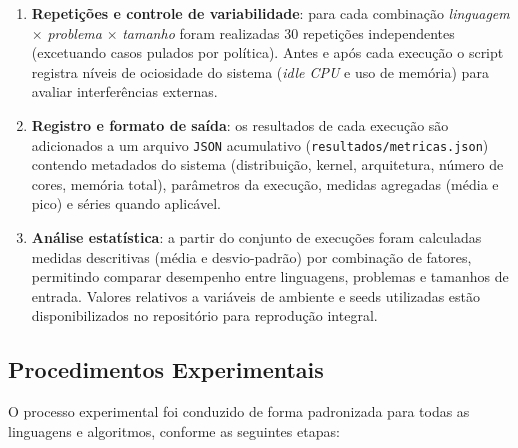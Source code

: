 \documentclass[12pt,a4paper]{article}
\newcommand{\eng}[1]{\textit{#1}}
\begin{document}
\begin{enumerate}
  \item \textbf{Repetições e controle de variabilidade}: para cada combinação \eng{linguagem} $\times$ \eng{problema} $\times$ \eng{tamanho} foram realizadas 30 repetições independentes (excetuando casos pulados por política). Antes e após cada execução o script registra níveis de ociosidade do sistema (\eng{idle CPU} e uso de memória) para avaliar interferências externas.

  \item \textbf{Registro e formato de saída}: os resultados de cada execução são adicionados a um arquivo \texttt{JSON} acumulativo (\texttt{resultados/metricas.json}) contendo metadados do sistema (distribuição, kernel, arquitetura, número de cores, memória total), parâmetros da execução, medidas agregadas (média e pico) e séries quando aplicável.

  \item \textbf{Análise estatística}: a partir do conjunto de execuções foram calculadas medidas descritivas (média e desvio-padrão) por combinação de fatores, permitindo comparar desempenho entre linguagens, problemas e tamanhos de entrada. Valores relativos a variáveis de ambiente e seeds utilizadas estão disponibilizados no repositório para reprodução integral.
\end{enumerate}

\subsection{Procedimentos Experimentais}
O processo experimental foi conduzido de forma padronizada para todas as linguagens e algoritmos, conforme as seguintes etapas:
\end{document}
